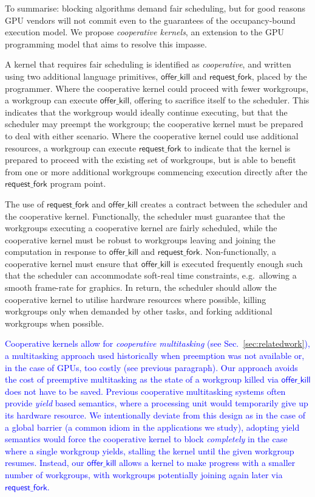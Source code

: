 \documentclass[sigconf]{acmart}
\newcommand{\TSAdded}[1]{\textcolor{blue}{#1}}
\newcommand{\mysec}{Sec.~}
\newcommand{\offerfork}{\mathsf{request\_fork}}
\newcommand{\offerkill}{\mathsf{offer\_kill}}
\begin{document}
%
To summarise: blocking algorithms
demand fair scheduling,
but for good reasons
GPU vendors will not commit even to the guarantees of the
occupancy-bound execution model.
%
We propose \emph{cooperative kernels}, an extension to the GPU
programming model that aims to resolve this impasse.

A kernel
that requires fair scheduling is identified as \emph{cooperative}, and written using two additional
language primitives, $\offerkill$ and $\offerfork$, placed by the programmer.
%
Where the cooperative kernel could proceed with fewer
workgroups, a workgroup can execute $\offerkill$, offering to
sacrifice itself to the scheduler.  This indicates that the workgroup
would ideally continue executing, but that the
scheduler may preempt the workgroup; the cooperative kernel
must be prepared to deal with either scenario.
%
Where the cooperative kernel could use additional resources, a workgroup can execute
$\offerfork$ to indicate that the
kernel is prepared to proceed with the existing set of workgroups, but
is able to benefit from one or more additional workgroups
commencing execution directly after the $\offerfork$ program point.

The use of $\offerfork$ and $\offerkill$ creates a contract between
the scheduler and the cooperative kernel.  Functionally, the scheduler
must guarantee that the workgroups executing a cooperative kernel are
fairly scheduled, while the cooperative kernel must be robust to
workgroups leaving and joining the computation in response to
$\offerkill$ and $\offerfork$.  Non-functionally, a cooperative kernel
must ensure that $\offerkill$ is executed frequently enough such that
the scheduler can accommodate soft-real time constraints,
e.g.\ allowing a smooth frame-rate for graphics.
In return, the scheduler should allow the cooperative kernel to
utilise hardware resources where possible, killing workgroups only
when demanded by other tasks, and forking additional workgroups when
possible. 

\TSAdded{Cooperative kernels allow for \emph{cooperative multitasking}
  (see \mysec{\ref{sec:relatedwork}}), a multitasking approach used
  historically when preemption was not available or, in the case of
  GPUs, too costly (see previous paragraph). Our approach avoids the
  cost of preemptive multitasking as the state of a workgroup killed
  via $\offerkill$ does not have to be saved. Previous cooperative
  multitasking systems often provide \emph{yield} based semantics,
  where a processing unit would temporarily give up its hardware
  resource. We intentionally deviate from this design as in the case
  of a global barrier (a common idiom in the applications we study),
  adopting yield semantics would force the cooperative kernel to block
  \emph{completely} in the case where a single workgroup yields,
  stalling the kernel until the given workgroup resumes.  Instead, our
  $\offerkill$ allows a kernel to make progress with a smaller number
  of workgroups, with workgroups potentially joining again later via
  $\offerfork$.}
\end{document}
